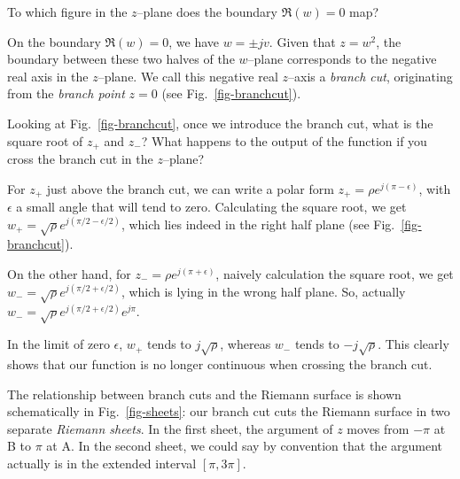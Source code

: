 \begin{cue}
To which figure in the $z$--plane does the boundary $\Re(w)=0$ map?
\end{cue}

On the boundary $\Re(w)=0$, we have $w=\pm jv$. Given that $z=w^2$, the boundary between these two halves of the $w$--plane corresponds to the negative real axis in the $z$--plane. We call this negative real $z$--axis a \emph{branch cut}, originating from the \emph{branch point} $z=0$ (see Fig.~\ref{fig-branchcut}).

\begin{cue}
Looking at Fig.~\ref{fig-branchcut}, once we introduce the branch cut, what is the square root of $z_+$ and $z_-$? What happens to the output of the function if you cross the branch cut in the $z$--plane? 
\end{cue}

For $z_+$ just above the branch cut, we can write a polar form $z_+ = \rho e^{j (\pi - \epsilon)}$, with $\epsilon$ a small angle that will tend to zero. Calculating the square root, we get $w_+ = \sqrt{\rho} e^{j (\pi/2 - \epsilon/2)}$, which lies indeed in the right half plane (see Fig.~\ref{fig-branchcut}).

On the other hand, for $z_- = \rho e^{j (\pi + \epsilon)}$, naively calculation the square root, we get $w_- = \sqrt{\rho} e^{j (\pi/2 + \epsilon/2)}$, which is lying in the wrong half plane. So, actually $w_- = \sqrt{\rho} e^{j (\pi/2 + \epsilon/2)} e^{j \pi}$.  

In the limit of zero $\epsilon$, $w_+$ tends to $j\sqrt{\rho}$, whereas $w_-$ tends to $-j\sqrt{\rho}$. This clearly shows that our function is no longer continuous when crossing the branch cut.

The relationship between branch cuts and the Riemann surface is shown schematically in Fig.~\ref{fig-sheets}: our branch cut cuts the Riemann surface in two separate \emph{Riemann sheets}. In the first sheet, the argument of $z$ moves from $-\pi$ at B to $\pi$ at A. In the second sheet, we could say by convention that the argument actually is in the extended interval $[\pi, 3\pi]$.


